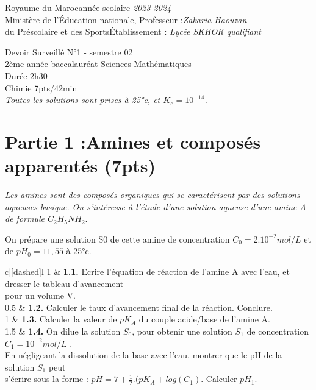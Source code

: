 \documentclass[12pt]{article}
\newcommand\headerMe[2]{\noindent{}#1\hfill#2}
\begin{document}
\headerMe{Royaume du Maroc}{année scolaire \emph{2023-2024}}\\
\headerMe{Ministère de l'Éducation nationale, }{  Professeur :\emph{Zakaria Haouzan}}\\
\headerMe{du Préscolaire et des Sports}{Établissement : \emph{Lycée SKHOR qualifiant}}\\

\begin{center}
Devoir Surveillé  N°1 - semestre 02 \\
    2ème année baccalauréat Sciences Mathématiques\\
Durée 2h30
\\
    \vspace{.2cm}
\hrulefill
\Large{Chimie 7pts/42min}
\hrulefill\\

	\emph{Toutes les solutions sont prises à 25°c, et $K_e=10^{-14}$. }
\end{center}

 \section*{Partie 1 :Amines et composés apparentés \dotfill(7pts) }

 \emph{Les amines sont des composés organiques qui se caractérisent par des solutions
aqueuses basique. On s’intéresse à l’étude d’une solution aqueuse d’une amine A de
formule $C_2H_5NH_2.$ }

On prépare une solution S0 de cette amine de concentration $C_0=2.10^{-2} mol/L$ et de $pH_0=11,55$ à 25°c.

\begin{tblr}{c|[dashed]l}
	1  & {\textbf{1.1. }Ecrire l’équation de réaction de l’amine A avec l’eau, et dresser le tableau
	d’avancement\\pour un volume V.} \\
	0.5  & \textbf{1.2. }Calculer le taux d’avancement final de la réaction. Conclure.\\
	1  & \textbf{1.3. }Calculer la valeur de $pK_A$ du couple acide/base de l’amine A. \\
	1.5  & {\textbf{1.4. }On dilue la solution $S_0$, pour obtenir une solution $S_1$ de concentration
	$C_1=10^{-2} mol/L$ . \\En négligeant la dissolution de la base avec l’eau, montrer que le
	pH de la solution $S_1$ peut\\ s’écrire sous la forme : $pH = 7 + \frac{1}{2}.(pK_A + log(C_1)$.
Calculer $pH_1$. } \\
\end{tblr}
\end{document}

